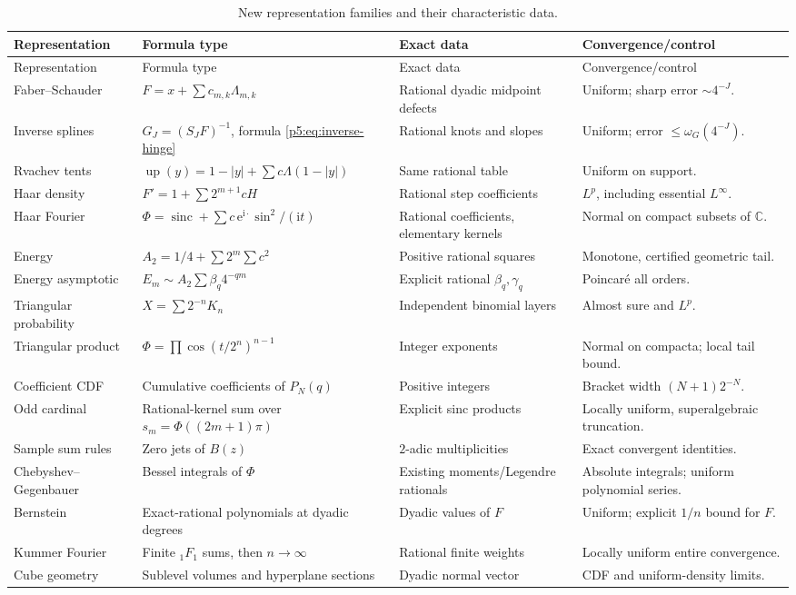 \documentclass[11pt,oneside]{article}
\theoremstyle{definition}
\newcommand{\e}{\mathrm e}
\newcommand{\ii}{\mathrm i}
\newcommand{\C}{\mathbb C}
\newcommand{\Up}{\operatorname{up}}
\newcommand{\sinc}{\operatorname{sinc}}
\begin{document}
\begingroup\small
\begin{longtable}{@{}>{\raggedright\arraybackslash}p{}>{\raggedright\arraybackslash}p{}>{\raggedright\arraybackslash}p{}>{\raggedright\arraybackslash}p{}@{}}
\caption{New representation families and their characteristic data.}\label{p5:tab:new-synthesis}\\
\toprule
Representation & Formula type & Exact data & Convergence/control \\
\midrule
\endfirsthead
\toprule
Representation & Formula type & Exact data & Convergence/control \\
\midrule
\endhead
Faber--Schauder & $F=x+\sum c_{m,k}\Lambda_{m,k}$ & Rational dyadic midpoint defects & Uniform; sharp error $\sim4^{-J}$.\\
Inverse splines & $G_J=(S_JF)^{-1}$, formula \eqref{p5:eq:inverse-hinge} & Rational knots and slopes & Uniform; error $\le\omega_G(4^{-J})$.\\
Rvachev tents & $\Up(y)=1-|y|+\sum c\Lambda(1-|y|)$ & Same rational table & Uniform on support.\\
Haar density & $F'=1+\sum2^{m+1}cH$ & Rational step coefficients & $L^p$, including essential $L^\infty$.\\
Haar Fourier & $\Phi=\sinc+\sum c\,\e^{\ii\cdot}\sin^2/(\ii t)$ & Rational coefficients, elementary kernels & Normal on compact subsets of $\C$.\\
Energy & $A_2=1/4+\sum2^m\sum c^2$ & Positive rational squares & Monotone, certified geometric tail.\\
Energy asymptotic & $E_m\sim A_2\sum\beta_q4^{-qm}$ & Explicit rational $\beta_q,\gamma_q$ & Poincaré all orders.\\
Triangular probability & $X=\sum2^{-n}K_n$ & Independent binomial layers & Almost sure and $L^p$.\\
Triangular product & $\Phi=\prod\cos(t/2^n)^{n-1}$ & Integer exponents & Normal on compacta; local tail bound.\\
Coefficient CDF & Cumulative coefficients of $P_N(q)$ & Positive integers & Bracket width $(N+1)2^{-N}$.\\
Odd cardinal & Rational-kernel sum over $s_m=\Phi((2m+1)\pi)$ & Explicit sinc products & Locally uniform, superalgebraic truncation.\\
Sample sum rules & Zero jets of $B(z)$ & $2$-adic multiplicities & Exact convergent identities.\\
Chebyshev--\newline Gegenbauer & Bessel integrals of $\Phi$ & Existing moments/Legendre rationals & Absolute integrals; uniform polynomial series.\\
Bernstein & Exact-rational polynomials at dyadic degrees & Dyadic values of $F$ & Uniform; explicit $1/n$ bound for $F$.\\
Kummer Fourier & Finite ${}_1F_1$ sums, then $n\to\infty$ & Rational finite weights & Locally uniform entire convergence.\\
Cube geometry & Sublevel volumes and hyperplane sections & Dyadic normal vector & CDF and uniform-density limits.\\
\bottomrule
\end{longtable}
\endgroup
\end{document}
